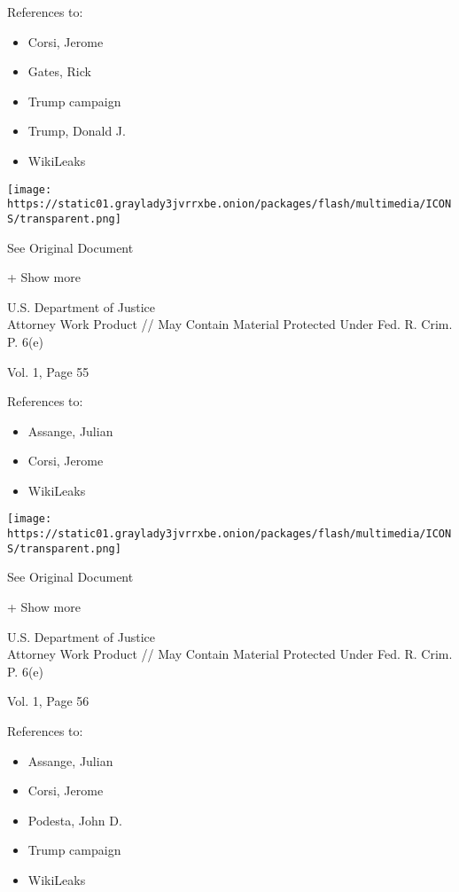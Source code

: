 References to:

\begin{itemize}
\tightlist
\item
  Corsi, Jerome
\item
  Gates, Rick
\item
  Trump campaign
\item
  Trump, Donald J.
\item
  WikiLeaks
\end{itemize}

\protect\hyperlink{}{}

\texttt{[image: https://static01.graylady3jvrrxbe.onion/packages/flash/multimedia/ICONS/transparent.png]}

See Original Document

+ Show more

U.S. Department of Justice\\
Attorney Work Product // May Contain Material Protected Under Fed. R.
Crim. P. 6(e)

Vol. 1, Page 55

References to:

\begin{itemize}
\tightlist
\item
  Assange, Julian
\item
  Corsi, Jerome
\item
  WikiLeaks
\end{itemize}

\protect\hyperlink{}{}

\texttt{[image: https://static01.graylady3jvrrxbe.onion/packages/flash/multimedia/ICONS/transparent.png]}

See Original Document

+ Show more

U.S. Department of Justice\\
Attorney Work Product // May Contain Material Protected Under Fed. R.
Crim. P. 6(e)

Vol. 1, Page 56

References to:

\begin{itemize}
\tightlist
\item
  Assange, Julian
\item
  Corsi, Jerome
\item
  Podesta, John D.
\item
  Trump campaign
\item
  WikiLeaks
\end{itemize}

